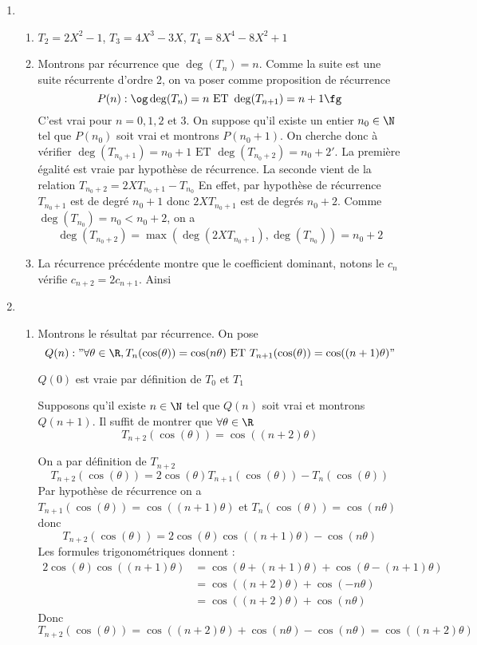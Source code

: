 \documentclass[a4paper, 11pt,reqno]{article}
\begin{document}
\begin{correction}
\begin{enumerate}
\item \begin{enumerate}
\item $T_2 = 2X^2-1$, $T_3 =4X^3-3X$, $T_4 = 8X^4 -8X^2+1 $
\item Montrons par récurrence que $\deg(T_n) =n$. 
Comme la suite est une suite récurrente d'ordre 2, on va poser comme proposition de récurrence $$P(n) : \og\deg(T_n) =n \text{ ET } \deg(T_{n+1}) =n+1\fg $$
C'est vrai pour $n=0,1,2$ et $3$.  On suppose qu'il existe un entier $n_0\in \N$ tel que $P(n_0)$ soit vrai et montrons $P(n_0+1)$. 
On cherche donc à vérifier $\deg(T_{n_0+1}) =n_0+1 \text{ ET } \deg(T_{n_0+2}) =n_0+2'$. La première égalité est vraie par hypothèse de récurrence. 
La seconde vient de la relation $T_{n_0+2} =2 X T_{n_0+1} -T_{n_0}$
En effet, par hypothèse de récurrence $T_{n_0+1}$ est de degré $n_0+1$ donc $2 X T_{n_0+1}$ est de degrés $n_0 +2$. Comme $\deg(T_{n_0}) =n_0<n_0+2$, on a 
$$\deg(T_{n_0+2} )=\max(\deg(2 X T_{n_0+1}),\deg(T_{n_0})) = n_0+2$$

\item La récurrence précédente montre que le coefficient dominant, notons le $c_n$ vérifie $c_{n+2} = 2 c_{n+1}$. Ainsi 

\end{enumerate}
\item 
\begin{enumerate}
\item Montrons le résultat par récurrence. On pose 
$$Q(n) : " \forall \theta\in \R, T_n(\cos(\theta)) =\cos(n\theta)  \text{ ET } T_{n+1}(\cos(\theta)) =\cos((n+1)\theta)"$$

$Q(0)$ est vraie par définition de $T_0 $ et $T_1$ 

Supposons qu'il existe $n\in \N$ tel que $Q(n)$ soit vrai et montrons $Q(n+1)$. Il suffit de montrer que $\forall \theta \in \R$
$$T_{n+2}(\cos(\theta) )=\cos((n+2)\theta)$$

On a par définition de $T_{n+2}$ 
$$T_{n+2} (\cos(\theta))  = 2\cos(\theta) T_{n+1}(\cos(\theta)) -T_n(\cos(\theta))$$
Par hypothèse de récurrence on a 
$T_{n+1}(\cos(\theta)) =\cos((n+1)\theta)$ et 
$T_{n}(\cos(\theta))=\cos(n\theta) $ donc  
$$T_{n+2} (\cos(\theta)) =2 \cos(\theta) \cos((n+1) \theta) - \cos(n \theta)$$
Les formules trigonométriques donnent : 
\begin{align*}
2 \cos(\theta) \cos((n+1) \theta)   &=\cos(\theta+(n+1) \theta) +\cos(\theta-(n+1) \theta)\\
&=\cos((n+2) \theta) + \cos(-n\theta)\\
&=\cos((n+2) \theta) + \cos(n\theta)
\end{align*}
Donc 
$$T_{n+2} (\cos(\theta))  = \cos((n+2) \theta) + \cos(n\theta)-\cos(n\theta) = \cos((n+2)\theta)
$$



\end{enumerate}
\end{enumerate}
\end{correction}
\end{document}
